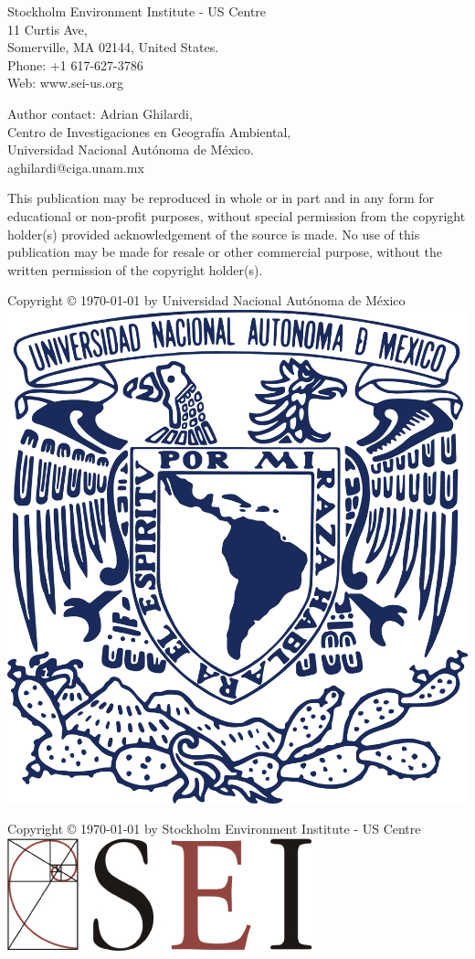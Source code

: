 \begin{titlepage}
\begin{flushleft}
Stockholm Environment Institute - US Centre \\
11 Curtis Ave, \\
Somerville, MA 02144, United States. \\
Phone: +1 617-627-3786 \\
Web: www.sei-us.org
\bigskip

Author contact: Adrian Ghilardi, \\
Centro de Investigaciones en Geografía Ambiental, \\
Universidad Nacional Autónoma de México. \\
aghilardi@ciga.unam.mx
\bigskip \bigskip \bigskip \bigskip \bigskip \bigskip \bigskip \bigskip


This publication may be reproduced in whole or in part and in any
form for educational or non-profit purposes, without special permission
from the copyright holder(s) provided acknowledgement
of the source is made. No use of this publication may be made for
resale or other commercial purpose, without the written permission
of the copyright holder(s).
\bigskip

Copyright ©
\today\enspace
by Universidad Nacional Autónoma de México \\
\smallskip
\includegraphics[width=0.075\linewidth]{../LULCC/Wizard_imgs/UNAM}
\bigskip

Copyright ©
\today{}\enspace
by Stockholm Environment Institute - US Centre \\
\smallskip
\includegraphics[width=0.1\linewidth]{../LULCC/Wizard_imgs/SEI}

\end{flushleft}
\end{titlepage}